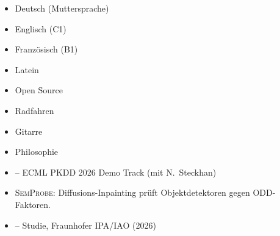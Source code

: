 {{    }
}{
    \vspace{0.05cm}
    \par\noindent
    \threecolumnsection
    {
    \vspace{0.55em}
    \begin{itemize}
    	\item Deutsch (Muttersprache)
    	\item Englisch (C1)
    	\item Französisch (B1)
    	\item Latein
    \end{itemize}}
    {
    \vspace{0.55em}
    \begin{itemize}
        \item Open Source
        \item Radfahren
        \item Gitarre
        \item Philosophie
    \end{itemize}
    }
    {
    \raggedright
    \vspace{0.55em}
    \begin{itemize}
        \item {} -- ECML PKDD 2026 Demo Track (mit N.\ Steckhan)
        \ifcvshowsemprobe
        \item[] {\footnotesize \textsc{SemProbe}: Diffusions-Inpainting prüft Objektdetektoren gegen ODD-Faktoren.}
        \fi
        \item {} -- Studie, Fraunhofer IPA/IAO (2026)
    \end{itemize}
    }
}

